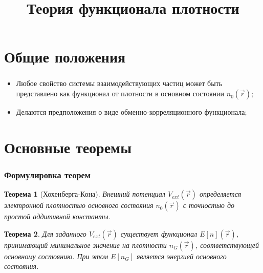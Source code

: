 \documentclass[t]{beamer}  %
\title{Теория функционала плотности}
\date{}
\newtheorem{rtheorem}{Теорема}
\begin{document}
\frame[plain]{\titlepage}	%

\section{Общие положения}
 
\begin{frame}
	\frametitle{\insertsection} 
	\begin{itemize}
        \item Любое свойство системы взаимодействующих частиц может быть представлено как функционал от плотности в основном состоянии $n_{0} (\vec{r})$;
        \item Делаются предположения о виде обменно-корреляционного функционала;
	\end{itemize}
\end{frame}


\section{Основные теоремы}
\begin{frame}
	\frametitle{Формулировка теорем}
    \begin{rtheorem}[Хохенберга-Кона]
        \label{th1}
        Внешний потенциал $V_{ext} (\vec{r})$ определяется электронной плотностью основного состояния $n_{0} (\vec{r})$ с точностью до простой аддитивной константы.
    \end{rtheorem}
    \begin{rtheorem}
        \label{th2}
        Для заданного $V_{ext} (\vec{r})$ существует функционал $E[n] (\vec{r})$, принимающий минимальное значение на плотности $n_G (\vec{r})$, соответствующей основному состоянию. При этом $E[n_G]$ является энергией основного состояния.
    \end{rtheorem}
\end{frame}
\end{document}
